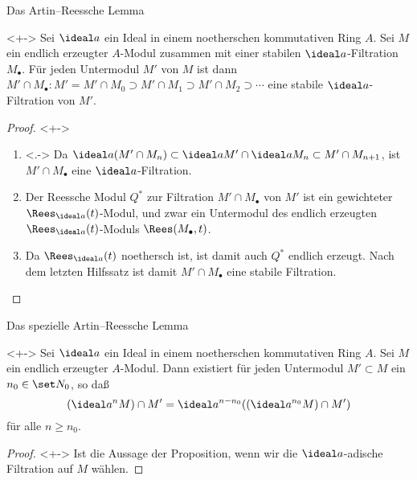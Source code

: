 \begin{frame}{Das Artin--Reessche Lemma}
	\begin{proposition}<+->
		Sei \(\ideal a\) ein Ideal in einem noetherschen kommutativen Ring
		\(A\). Sei \(M\) ein endlich erzeugter \(A\)-Modul zusammen mit einer
		stabilen \(\ideal a\)-Filtration \(M_\bullet\). Für jeden Untermodul
		\(M'\) von \(M\) ist dann \(M' \cap M_\bullet\colon M' = M' \cap M_0
		\supset M' \cap M_1 \supset M' \cap M_2 \supset \dotsb\) eine
		stabile \(\ideal a\)-Filtration von \(M'\).
	\end{proposition}
	\begin{proof}<+->
		\begin{enumerate}[<+->]
		\item<.->
			Da \(\ideal a (M' \cap M_n) \subset \ideal a M' \cap \ideal a M_n
			\subset M' \cap M_{n + 1}\), ist \(M' \cap M_\bullet\) eine
			\(\ideal a\)-Filtration.
		\item
			Der Reessche Modul \(Q^*\) zur Filtration \(M' \cap M_\bullet\)
			von \(M'\) ist ein gewichteter \(\Rees_{\ideal a}(t)\)-Modul, und zwar
			ein Untermodul des endlich erzeugten \(\Rees_{\ideal a}(t)\)-Moduls
			\(\Rees(M_\bullet, t)\).
		\item
			Da \(\Rees_{\ideal a}(t)\) noethersch ist, ist damit auch
			\(Q^*\) endlich erzeugt. Nach dem letzten Hilfssatz ist damit
			\(M' \cap M_\bullet\) eine stabile Filtration.
			\qedhere
		\end{enumerate}
	\end{proof}
\end{frame}

\begin{frame}{Das spezielle Artin--Reessche Lemma}
	\begin{corollary}<+->
		Sei \(\ideal a\) ein Ideal in einem noetherschen kommutativen Ring \(A\).
		Sei \(M\) ein endlich erzeugter \(A\)-Modul. Dann existiert für jeden Untermodul \(M' \subset M\)
		ein \(n_0 \in \set N_0\),
		so daß
		\[
			(\ideal a^n M) \cap M' = \ideal a^{n - n_0} ((\ideal a^{n_0} M) \cap M')
		\]
		für alle \(n \ge n_0\).
	\end{corollary}
	\begin{proof}<+->
		Ist die Aussage der Proposition, wenn wir die \(\ideal a\)-adische Filtration
		auf \(M\) wählen.
	\end{proof}
\end{frame}

